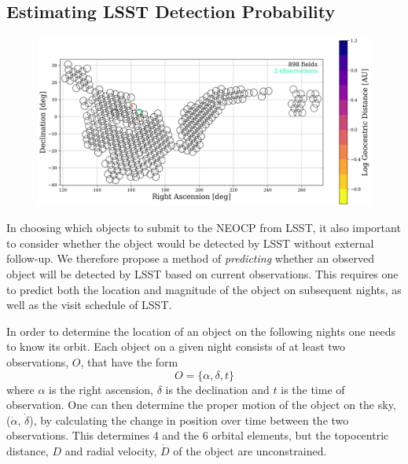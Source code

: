 \documentclass[twocolumn]{aastex631}
\begin{document}
\subsection{Estimating LSST Detection Probability}\label{sec:pred_alg}
\begin{figure}[htb]
    \centering
    \includegraphics[width=\textwidth]{methods_placeholder.png}
    \caption{}
\end{figure}

In choosing which objects to submit to the NEOCP from LSST, it also important to consider whether the object would be detected by LSST without external follow-up. We therefore propose a method of \textit{predicting} whether an observed object will be detected by LSST based on current observations. This requires one to predict both the location and magnitude of the object on subsequent nights, as well as the visit schedule of LSST.

In order to determine the location of an object on the following nights one needs to know its orbit. Each object on a given night consists of at least two observations, $O$, that have the form
\begin{equation}
    O = \{ \alpha, \delta, t \}
\end{equation}
where $\alpha$ is the right ascension, $\delta$ is the declination and $t$ is the time of observation. One can then determine the proper motion of the object on the sky, ($\dot{\alpha}$, $\dot{\delta}$), by calculating the change in position over time between the two observations. This determines 4 and the 6 orbital elements, but the topocentric distance, $D$ and radial velocity, $\dot{D}$ of the object are unconstrained.
\end{document}
